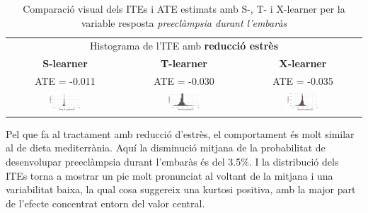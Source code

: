 \documentclass[../main.tex]{subfiles}
\begin{document}
    
    \begin{table}[H]
        \centering
        \begin{tabular}{ccc}
        \multicolumn{3}{c}{Histograma de l'ITE amb \textbf{reducció estrès}} \\
        \small \textbf{S-learner} & \small \textbf{T-learner} & \small \textbf{X-learner} \\
        \footnotesize ATE = -0.011 & \footnotesize ATE = -0.030 & \footnotesize ATE = -0.035 \\
        \includegraphics[width=0.3\textwidth]{imgs/histogrames/hist(PE)S_tract3.jpg} &
        \includegraphics[width=0.3\textwidth]{imgs/histogrames/hist(PE)T_tract3.jpg} &
        \includegraphics[width=0.3\textwidth]{imgs/histogrames/hist(PE)X_tract3.jpg} \\
        \end{tabular}
        \caption{\footnotesize Comparació visual dels ITEs i ATE estimats amb S-, T- i X-learner per la variable resposta \textit{preeclàmpsia durant l’embaràs}}
        \label{tab:histITE_PE3}
    \end{table}
    
    Pel que fa al tractament amb reducció d'estrès, el comportament és molt similar al de dieta mediterrània. Aquí la disminució mitjana de la probabilitat de desenvolupar preeclàmpsia durant l’embaràs és del 3.5\%. I la distribució dels ITEs torna a mostrar un pic molt pronunciat al voltant de la mitjana i una variabilitat baixa, la qual cosa suggereix una kurtosi positiva, amb la major part de l’efecte concentrat entorn del valor central.
    
\end{document}
